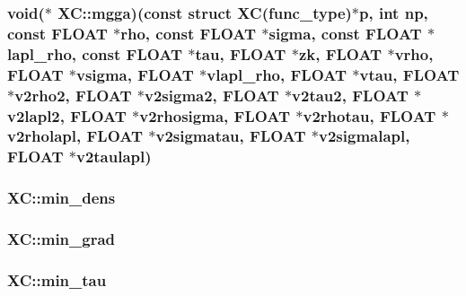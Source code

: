 \hypertarget{struct_x_c_ad87be8e642c48764820f9e5bce23fec1}{
\subsubsection[{mgga}]{\setlength{\rightskip}{0pt plus 5cm}void($\ast$ X\-C\-::mgga)(const struct {\bf X\-C}(func\-\_\-type)$\ast$p, int np, const {\bf F\-L\-O\-A\-T} $\ast${\bf rho}, const {\bf F\-L\-O\-A\-T} $\ast$sigma, const {\bf F\-L\-O\-A\-T} $\ast$lapl\-\_\-rho, const {\bf F\-L\-O\-A\-T} $\ast$tau, {\bf F\-L\-O\-A\-T} $\ast$zk, {\bf F\-L\-O\-A\-T} $\ast$vrho, {\bf F\-L\-O\-A\-T} $\ast$vsigma, {\bf F\-L\-O\-A\-T} $\ast$vlapl\-\_\-rho, {\bf F\-L\-O\-A\-T} $\ast$vtau, {\bf F\-L\-O\-A\-T} $\ast$v2rho2, {\bf F\-L\-O\-A\-T} $\ast$v2sigma2, {\bf F\-L\-O\-A\-T} $\ast$v2tau2, {\bf F\-L\-O\-A\-T} $\ast$v2lapl2, {\bf F\-L\-O\-A\-T} $\ast$v2rhosigma, {\bf F\-L\-O\-A\-T} $\ast$v2rhotau, {\bf F\-L\-O\-A\-T} $\ast$v2rholapl, {\bf F\-L\-O\-A\-T} $\ast$v2sigmatau, {\bf F\-L\-O\-A\-T} $\ast$v2sigmalapl, {\bf F\-L\-O\-A\-T} $\ast$v2taulapl)}}\label{struct_x_c_ad87be8e642c48764820f9e5bce23fec1}
\hypertarget{struct_x_c_a45690b44b2c673b610f877c441111338}{
\subsubsection[{min\-\_\-dens}]{ X\-C\-::min\-\_\-dens}}\label{struct_x_c_a45690b44b2c673b610f877c441111338}
\hypertarget{struct_x_c_aab049f763479029744a763ee093e2f92}{
\subsubsection[{min\-\_\-grad}]{ X\-C\-::min\-\_\-grad}}\label{struct_x_c_aab049f763479029744a763ee093e2f92}
\hypertarget{struct_x_c_a618138ac871ab68f515cf4f33955ee00}{
\subsubsection[{min\-\_\-tau}]{ X\-C\-::min\-\_\-tau}}\label{struct_x_c_a618138ac871ab68f515cf4f33955ee00}
